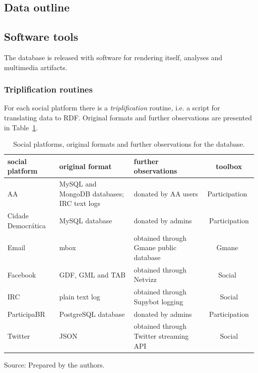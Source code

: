 \subsection{Data outline}




\subsection{Software tools}
The database is released with software for rendering itself, analyses and
multimedia artifacts.
\subsubsection{Triplification routines}
For each social platform there is a \emph{triplification} routine,
i.e. a script for translating data to RDF.
Original formats and further observations are presented in
Table~\ref{tab:provenance}.
\begin{table}[h!]\scriptsize
	\begin{center}
		\caption{Social platforms, original formats and further observations for
		the database.}\label{tab:provenance}
		\begin{tabular}{| l || p{3cm} | p{3cm} | c |}\hline
			\textbf{social platform} & \textbf{original format} & \textbf{further observations} & \textbf{toolbox} \\\hline\hline
				AA & MySQL and MongoDB databases; IRC text logs & donated by AA users & Participation~\cite{participation} \\\hline
				    Cidade Democrática & MySQL database & donated by admins & Participation \\\hline
					Email & mbox & obtained through Gmane public database & Gmane~\cite{gmane} \\\hline
					    Facebook & GDF, GML and TAB & obtained through Netvizz~\cite{netvizz} & Social~\cite{social} \\\hline
						IRC & plain text log & obtained through Supybot logging & Social \\\hline
						    ParticipaBR & PostgreSQL database & donated by admins & Participation \\\hline
							Twitter & JSON & obtained through Twitter streaming API & Social \\\hline
		\end{tabular}
\begin{flushleft}
		Source: Prepared by the authors.\
\end{flushleft}
	\end{center}
	\end{table}                    
